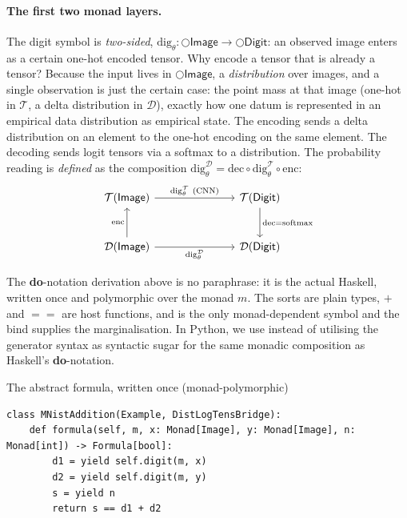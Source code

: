 \documentclass[anon]{../../journal-templates/NeSy26/nesy2026} %
\begin{document}
\paragraph{The first two monad layers.}  The digit symbol is \emph{two-sided},
$\mathrm{dig}_\theta \colon \bigcirc\mathsf{Image} \to \bigcirc\mathsf{Digit}$: an observed image enters
as a certain one-hot encoded tensor. Why encode a tensor that is already a tensor? Because the input lives in
$\bigcirc\mathsf{Image}$, a \emph{distribution} over images, and a single observation is just the certain
case: the point mass at that image (one-hot in $\mathcal{T}$, a delta distribution in $\mathcal D$), exactly how one
datum is represented in an empirical data distribution as empirical state. The encoding sends a delta distribution on an element to the one-hot encoding on the same element. The decoding sends logit tensors via a softmax to a distribution. The
probability reading is \emph{defined} as the composition
$\mathrm{dig}_\theta^{\mathcal D} = \mathrm{dec}\circ\mathrm{dig}_\theta^{\mathcal{T}}\circ\mathrm{enc}$:
\[\begin{tikzcd}[ampersand replacement=\&, sep=large]
  {\mathcal{T}(\mathsf{Image})} \&\& {\mathcal{T}(\mathsf{Digit})} \\
  {\mathcal D(\mathsf{Image})} \&\& {\mathcal D(\mathsf{Digit})}
  \arrow["{\mathrm{dig}_\theta^{\mathcal{T}}\ (\text{CNN})}", from=1-1, to=1-3]
  \arrow["{\mathrm{dig}_\theta^{\mathcal D}}"', from=2-1, to=2-3]
  \arrow["{\mathrm{enc}}", from=2-1, to=1-1]
  \arrow["{\mathrm{dec}=\mathrm{softmax}}", from=1-3, to=2-3]
\end{tikzcd}\]
  
 \noindent 
The \textbf{do}-notation derivation above is no
paraphrase: it is the actual Haskell, written once and polymorphic over the monad $m$. The sorts are
plain types, $\mathtt{+}$ and $\mathtt{==}$ are host functions, and
 is the only monad-dependent symbol and the bind
supplies the marginalisation. In Python, we use  instead of \minth{<-} utilising the generator syntax as syntactic sugar for the same monadic composition as Haskell's \textbf{do}-notation.

\begin{impl}{The abstract formula, written once (monad-polymorphic)}{}
  \small
  \begin{verbatim}
class MNistAddition(Example, DistLogTensBridge):
    def formula(self, m, x: Monad[Image], y: Monad[Image], n: Monad[int]) -> Formula[bool]:
        d1 = yield self.digit(m, x)
        d2 = yield self.digit(m, y)
        s = yield n
        return s == d1 + d2
  \end{verbatim}
\end{impl}
\end{document}

